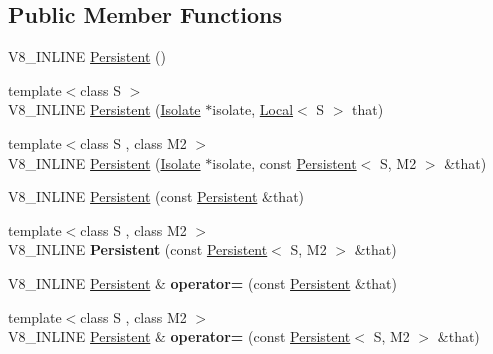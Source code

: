 \subsection*{Public Member Functions}
\begin{DoxyCompactItemize}
\item 
V8\+\_\+\+I\+N\+L\+I\+NE \hyperlink{classv8_1_1_persistent_a5ce14612215393683d814056015a102d}{Persistent} ()
\item 
{\footnotesize template$<$class S $>$ }\\V8\+\_\+\+I\+N\+L\+I\+NE \hyperlink{classv8_1_1_persistent_aabe9a42d7971bd31173bca34186d9ac2}{Persistent} (\hyperlink{classv8_1_1_isolate}{Isolate} $\ast$isolate, \hyperlink{classv8_1_1_local}{Local}$<$ S $>$ that)
\item 
{\footnotesize template$<$class S , class M2 $>$ }\\V8\+\_\+\+I\+N\+L\+I\+NE \hyperlink{classv8_1_1_persistent_aaf9eb7c4e6d0ef2c81a2c08238653578}{Persistent} (\hyperlink{classv8_1_1_isolate}{Isolate} $\ast$isolate, const \hyperlink{classv8_1_1_persistent}{Persistent}$<$ S, M2 $>$ \&that)
\item 
V8\+\_\+\+I\+N\+L\+I\+NE \hyperlink{classv8_1_1_persistent_a22331e91572784cd5ed5519739bb50c7}{Persistent} (const \hyperlink{classv8_1_1_persistent}{Persistent} \&that)
\item 
{\footnotesize template$<$class S , class M2 $>$ }\\V8\+\_\+\+I\+N\+L\+I\+NE {\bfseries Persistent} (const \hyperlink{classv8_1_1_persistent}{Persistent}$<$ S, M2 $>$ \&that)\hypertarget{classv8_1_1_persistent_ace17fd143fb6414d305871bf0a53ef57}{}\label{classv8_1_1_persistent_ace17fd143fb6414d305871bf0a53ef57}

\item 
V8\+\_\+\+I\+N\+L\+I\+NE \hyperlink{classv8_1_1_persistent}{Persistent} \& {\bfseries operator=} (const \hyperlink{classv8_1_1_persistent}{Persistent} \&that)\hypertarget{classv8_1_1_persistent_aa1db9923b3212fb8ce57868217858b39}{}\label{classv8_1_1_persistent_aa1db9923b3212fb8ce57868217858b39}

\item 
{\footnotesize template$<$class S , class M2 $>$ }\\V8\+\_\+\+I\+N\+L\+I\+NE \hyperlink{classv8_1_1_persistent}{Persistent} \& {\bfseries operator=} (const \hyperlink{classv8_1_1_persistent}{Persistent}$<$ S, M2 $>$ \&that)\hypertarget{classv8_1_1_persistent_a11104ee8739cb1f25e40fd17d746b48f}{}\label{classv8_1_1_persistent_a11104ee8739cb1f25e40fd17d746b48f}


\end{DoxyCompactItemize}
